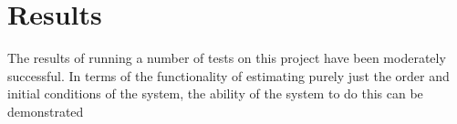 \section{Results}

The results of running a number of tests on this project have been moderately successful. In terms of the functionality of estimating purely just the order and initial conditions of the system, the ability of the system to do this can be demonstrated 
